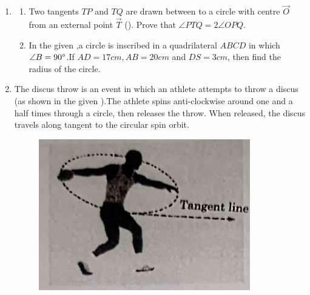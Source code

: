 \documentclass[12pt,A4 paper]{article}
\begin{document}
\begin{enumerate}
\begin{table}[!ht]
	        \centering
	        
		\caption{}
		\label{tab:tab:2}
        \end{table}






\item
  \begin{enumerate}
	  \item Two tangents $TP$ and $TQ$ are drawn between to a circle with centre $\vec{O}$ from an external point $\vec{T}$ (). Prove that $\angle PTQ = 2 \angle OPQ$.
\begin{figure}[h]
	        \centering
	        
		\caption{}
		\label{fig:fig:5}
        \end{figure}





\item In the given ,a circle is inscribed in a quadrilateral $ABCD$ in which $\angle B =90\degree$.If $AD=17cm,AB=20cm$ and $DS=3cm$, then find the radius of the circle.

\begin{figure}[h]
	        \centering
	        
		\caption{}
		\label{fig:fig:6}
\end{figure}
   \end{enumerate}






\item The discus throw is an event in which an athlete attempts to throw a discus (as shown in the given ).The athlete spins anti-clockwise around one and a half times through a circle, then releases the throw. When released, the discus travels along tangent to the circular spin orbit.


\begin{figure}[H]	
	        \centering
		\includegraphics[width=\columnwidth]{figs/fig0.png}
		\caption{}
		\label{fig:fig:0}
\end{figure}




\end{enumerate}
\end{document}
